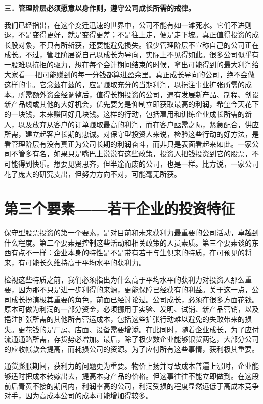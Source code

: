 \documentclass[UTF8,a4paper,zihao=-4,fontset = windows]{ctexart} %
\begin{document}
\textbf{三．管理阶层必须愿意以身作则，遵守公司成长所需的戒律。}


我们已经指出，在这个变迁迅速的世界中，公司不能有如一滩死水。它们不进则退，不是变得更好，就是变得更差；不是往上走，便是走下坡。真正值得投资的成长股对象，不只有所斩获，还要能避免损失。很少管理阶层不宣称自己的公司正在成长。不过，管理阶层说自己以成长为导向，实际上不见得如此。很多公司似乎有一股难以抗拒的驱力，想在每个会计期间结束的时候，拿出可能得到的最大利润给大家看──把可能赚到的每一分钱都算进盈余里。真正成长导向的公司，绝不会做这样的事。它念兹在兹的，应是赚取充分的当期利润，以挹注事业扩张所需的成本。所需额外资金经调整后，值得长期投资的公司，遇有发展新产品、制程、创设新产品线或其他的大好机会，优先要务是仰制立即获取最高的利润，希望今天花下的一块钱，未来赚回好几块钱。这样的行动，包括雇用和训练企业成长所需的新人，以及放弃从客户的订单赚取最高的利润，而在客户亟需之际，紧急配合，供应所需，建立起客户长期的忠诚。对保守型投资人来说，检验这些行动的好方法，是看管理阶层有没有真正为公司长期的利润奋斗，而非只是表面看起来如此。一家公司不管多有名，如果只是嘴巴上说说有这些政策，投资人把钱投资到它的股票，不可能得到快乐。想要见贤思齐，但半途而废的公司，也是一样。比方说，一家公司花了庞大的研究支出，但努力方向不对，可能毫无所获。

\section{第三个要素——若干企业的投资特征}

保守型股票投资的第一个要素，是对目前和未来获利力最重要的公司活动，卓越到什么程度。第二个要素是控制这些活动和相关政策的人员素质。第三个要素谈的东西有点不一样：企业本身的特性是不是带有若干与生俱来的特质，在可预见的将来，有可能长久维持高于平均水平的获利力。

检视这些特质之前，我们必须指出为什么高于平均水平的获利力对投资人那么重要，因为那不只是进一步利得的来源，更能保障已经获有的利益。关于这一点，公司成长扮演极其重要的角色，前面已经讨论过。公司成长，必须在很多方面花钱。原本可做为利润的一部分资金，必须挪用于实验、发明、试销、新产品营销，以及挹注扩张所需的其他所有营运成本，包括这些扩张行动难以避免的失败带来的损失。更花钱的是厂房、店面、设备需要增添。在此同时，随着企业成长，为了应付流通通路所需，存货势必增加。最后，除了极少数企业能够银货两讫，大部分公司的应收帐款会提高，而耗损公司的资源。为了应付所有这些事情，获利极其重要。

通货膨胀期间，获利力的问题更为重要。物价上扬并导致成本普遍上涨时，企业能够适时把成本转嫁出去，提高本身产品的价格。但这事往往不能立即做到。在这段前后青黄不接的期间内，利润率高的公司，利润受损的程度显然远低于高成本竞争对手，因为高成本公司的成本可能增加得较多。
\end{document}
